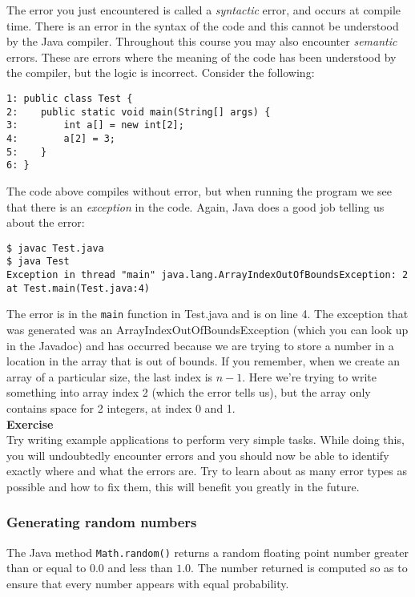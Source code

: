 \noindent
The error you just encountered is called a \emph{syntactic} error, and occurs at compile time. There is an error in the syntax of the code and this cannot be understood by the Java compiler. Throughout this course you may also encounter \emph{semantic} errors. These are errors where the meaning of the code has been understood by the compiler, but the logic is incorrect. Consider the following:

\begin{verbatim}
1: public class Test {
2:    public static void main(String[] args) {
3:        int a[] = new int[2];
4:        a[2] = 3;
5:    }
6: }
\end{verbatim}

\noindent
The code above compiles without error, but when running the program we see that there is an \emph{exception} in the code. Again, Java does a good job telling us about the error:

\begin{verbatim}
$ javac Test.java
$ java Test
Exception in thread "main" java.lang.ArrayIndexOutOfBoundsException: 2
at Test.main(Test.java:4)
\end{verbatim}

\noindent
The error is in the {\tt main} function in Test.java and is on line 4. The exception that was generated was an ArrayIndexOutOfBoundsException (which you can look up in the Javadoc) and has occurred because we are trying to store a number in a location in the array that is out of bounds. If you remember, when we create an array of a particular size, the last index is $n-1$. Here we're trying to write something into array index 2 (which the error tells us), but the array only contains space for 2 integers, at index 0 and 1.\\

\noindent
{\bf Exercise}\\

\noindent
Try writing example applications to perform very simple tasks. While doing this, you will undoubtedly encounter errors and you should now be able to identify exactly where and what the errors are. Try to learn about as many error types as possible and how to fix them, this will benefit you greatly in the future.


\subsubsection{Generating random numbers}

The Java method {\tt Math.random()} returns a random floating point number 
greater than or equal to $0.0$ and less than $1.0$. The number
returned is computed so as to ensure that every number appears with
equal probability. \\

